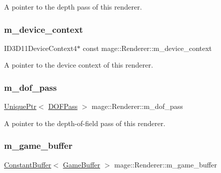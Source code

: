 A pointer to the depth pass of this renderer. \hypertarget{classmage_1_1_renderer_ab4161386c4ddd51aa6d3299c10f1744a}{}\label{classmage_1_1_renderer_ab4161386c4ddd51aa6d3299c10f1744a} 
\subsubsection{\texorpdfstring{m\+\_\+device\+\_\+context}{m\_device\_context}}
{\footnotesize\ttfamily I\+D3\+D11\+Device\+Context4$\ast$ const mage\+::\+Renderer\+::m\+\_\+device\+\_\+context\hspace{0.3cm}{\ttfamily [private]}}

A pointer to the device context of this renderer. \hypertarget{classmage_1_1_renderer_aa0c9add6ebb5bf1ace9592c6041bf5a8}{}\label{classmage_1_1_renderer_aa0c9add6ebb5bf1ace9592c6041bf5a8} 
\subsubsection{\texorpdfstring{m\+\_\+dof\+\_\+pass}{m\_dof\_pass}}
{\footnotesize\ttfamily \hyperlink{namespacemage_a3316d7143a973e37adf1110f2e80ca31}{Unique\+Ptr}$<$ \hyperlink{classmage_1_1_d_o_f_pass}{D\+O\+F\+Pass} $>$ mage\+::\+Renderer\+::m\+\_\+dof\+\_\+pass\hspace{0.3cm}{\ttfamily [private]}}

A pointer to the depth-\/of-\/field pass of this renderer. \hypertarget{classmage_1_1_renderer_abba23dce8a4946d352f901707900857b}{}\label{classmage_1_1_renderer_abba23dce8a4946d352f901707900857b} 
\subsubsection{\texorpdfstring{m\+\_\+game\+\_\+buffer}{m\_game\_buffer}}
{\footnotesize\ttfamily \hyperlink{structmage_1_1_constant_buffer}{Constant\+Buffer}$<$ \hyperlink{structmage_1_1_game_buffer}{Game\+Buffer} $>$ mage\+::\+Renderer\+::m\+\_\+game\+\_\+buffer\hspace{0.3cm}{\ttfamily [private]}}

